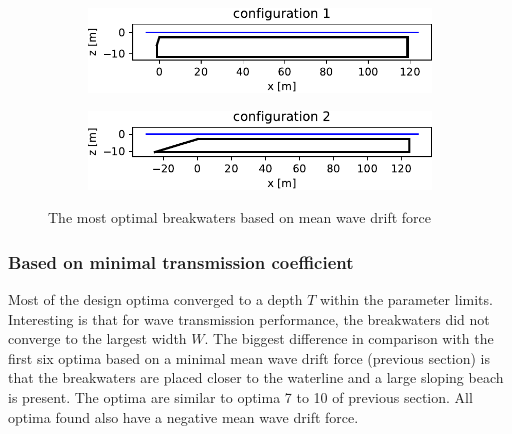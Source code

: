 \begin{figure}[h]
    \centering
    \begin{subfigure}[b]{0.475\textwidth}
        \centering
        \includegraphics[width=\textwidth]{figures/ComFLOW/Breakwater Geometries/Design Iteration 2 captive/breakwater_geometry1_Fd.pdf}
        \caption[]%
        {{\small}}    
        \label{fig: opt breakwater 1 DI2}
    \end{subfigure}
    \hfill
    \begin{subfigure}[b]{0.475\textwidth}
        \centering
        \includegraphics[width=\textwidth]{figures/ComFLOW/Breakwater Geometries/Design Iteration 2 captive/breakwater_geometry2_Fd.pdf}
        \caption[]%
        {{\small}}    
        \label{fig: opt breakwater 1 DI2}
    \end{subfigure}
    \caption{The most optimal breakwaters based on mean wave drift force}
    \label{fig:  most optimal breakwaters DI2}
\end{figure}









\subsubsection{Based on minimal transmission coefficient}
Most of the design optima converged to a depth $T$ within the parameter limits. Interesting is that for wave transmission performance, the breakwaters did not converge to the largest width $W$. The biggest difference in comparison with the first six optima based on a minimal mean wave drift force (previous section) is that the breakwaters are placed closer to the waterline and a large sloping beach is present. The optima are similar to optima 7 to 10 of previous section. All optima found also have a negative mean wave drift force. 



